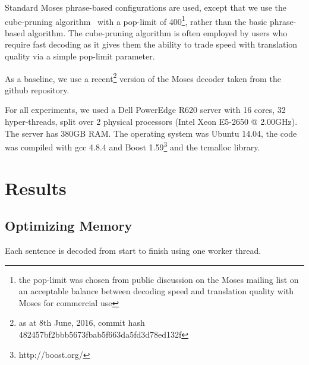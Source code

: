 \documentclass[11pt]{article}
\begin{document}
Standard Moses phrase-based configurations are used, except that we use the cube-pruning algorithm~\cite{Chiang:2007:cl} with a pop-limit of 400\footnote{the pop-limit was chosen from public discussion on the Moses mailing list on an acceptable balance between decoding speed and translation quality with Moses for commercial use %
}, rather than the basic phrase-based algorithm. The cube-pruning algorithm is often employed by users who require fast decoding as it gives them the ability to trade speed with translation quality via a simple pop-limit parameter.

As a baseline, we use a recent\footnote{as at 8th June, 2016, commit hash \scriptsize{482457bf2bbb5673fbab5f663da5fd3d78ed132f} } version of the Moses decoder taken from the github repository.

For all experiments, we used a Dell PowerEdge R620 server with 16 cores, 32 hyper-threads, split over 2 physical processors (Intel Xeon E5-2650 @ 2.00GHz). The server has 380GB RAM. The operating system was Ubuntu 14.04, the code was compiled with gcc 4.8.4 and Boost 1.59\footnote{http://boost.org/} and the tcmalloc library.

\section{Results}

\subsection{Optimizing Memory}

Each sentence is decoded from start to finish using one worker thread. %
\end{document}
